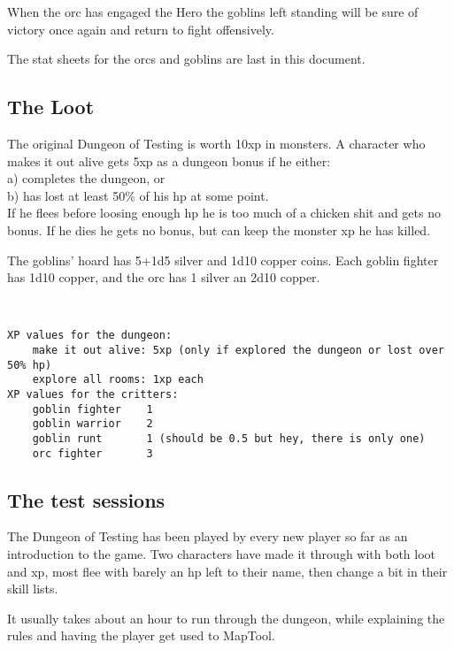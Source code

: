 When the orc has engaged the Hero the goblins left standing will be sure of victory once again and return to fight offensively.

The stat sheets for the orcs and goblins are last in this document.




\subsection*{The Loot}

The original Dungeon of Testing is worth 10xp in monsters. A character who makes it out alive gets 5xp as a dungeon bonus if he either: \\
a) completes the dungeon, or \\
b) has lost at least 50\% of his hp at some point. \\
If he flees before loosing enough hp he is too much of a chicken shit and gets no bonus. If he dies he gets no bonus, but can keep the monster xp he has killed.

The goblins' hoard has 5+1d5 silver and 1d10 copper coins.
Each goblin fighter has 1d10 copper, and the orc has 1 silver an 2d10 copper.

\

\begin{samepage} \small \begin{verbatim}
XP values for the dungeon:
    make it out alive: 5xp (only if explored the dungeon or lost over 50% hp)
    explore all rooms: 1xp each
XP values for the critters:
    goblin fighter    1
    goblin warrior    2
    goblin runt       1 (should be 0.5 but hey, there is only one)
    orc fighter       3
\end{verbatim} \normalsize \end{samepage}



\subsection*{The test sessions}

The Dungeon of Testing has been played by every new player so far as an introduction to the game. Two characters have made it through with both loot and xp, most flee with barely an hp left to their name, then change a bit in their skill lists.

It usually takes about an hour to run through the dungeon, while explaining the rules and having the player get used to MapTool. 

